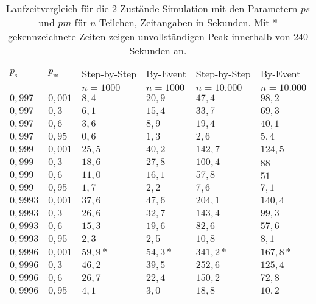 \begin{table}[h]
\centering
\caption[Laufzeitvergleich für die 2-Zustände Simulation]{Laufzeitvergleich für die 2-Zustände Simulation mit den Parametern $ps$ und $pm$ für $n$ Teilchen, Zeitangaben in Sekunden. Mit * gekennzeichnete Zeiten zeigen unvollständigen Peak innerhalb von $240$ Sekunden an.}
\label{2s_laufzeit}
\begin{tabular}{|l|l||l|l|l|l|} \hline
$p_\text{s}$ & $p_\text{m}$  & Step-by-Step & By-Event & Step-by-Step & By-Event \\ 
 &   & $n=1000$ &$n=1000$ &$n=10.000$ &$n=10.000$  \\ \hline \hline
$0,997  $ & $ 0,001 $ & $ 8,4  $ & $ 20,9  $ & $ 47,4  $ & $98,2  $\\ \hline
$0,997  $ & $ 0,3  $ & $ 6,1  $ & $ 15,4  $ & $ 33,7  $ & $69,3  $\\ \hline
$0,997  $ & $ 0,6  $ & $ 3,6  $ & $ 8,9   $  & $ 19,4 $ & $40,1  $\\ \hline
$0,997  $ & $ 0,95 $ & $ 0,6  $ & $ 1,3   $  & $ 2,6  $ & $5,4   $\\ \hline
$0,999  $ & $ 0,001 $ & $ 25,5 $ & $ 40,2  $ & $ 142,7 $ & $124,5 $\\ \hline
$0,999  $ & $ 0,3  $ & $ 18,6 $ & $ 27,8  $ & $ 100,4 $ & $88    $\\ \hline
$0,999  $ & $ 0,6  $ & $ 11,0 $ & $ 16,1  $ & $ 57,8  $ & $51    $\\ \hline
$0,999  $ & $ 0,95 $ & $ 1,7  $ & $ 2,2   $ & $ 7,6   $ & $7,1   $\\ \hline
$0,9993 $ & $ 0,001 $ & $ 37,6 $ & $ 47,6  $ & $ 204,1 $ & $140,4 $\\ \hline
$0,9993 $ & $ 0,3  $ & $ 26,6 $ & $ 32,7  $ & $ 143,4 $ & $99,3  $\\ \hline
$0,9993 $ & $ 0,6  $ & $ 15,3 $ & $ 19,6  $ & $ 82,6  $ & $57,6  $\\ \hline
$0,9993 $ & $ 0,95 $ & $ 2,3  $ & $ 2,5   $ & $ 10,8  $ & $8,1   $\\ \hline
$0,9996 $ & $ 0,001 $ & $ 59,9*$ & $ 54,3* $ & $341,2* $ & $167,8*$\\ \hline
$0,9996 $ & $ 0,3  $ & $ 46,2 $ & $ 39,5  $ & $ 252,6 $ & $125,4 $\\ \hline
$0,9996 $ & $ 0,6  $ & $ 26,7 $ & $ 22,4  $ & $ 150,2 $ & $72,8  $\\ \hline
$0,9996 $ & $ 0,95 $ & $ 4,1  $ & $ 3,0   $ & $ 18,8  $ & $10,2  $\\ \hline
\end{tabular}
\end{table}

